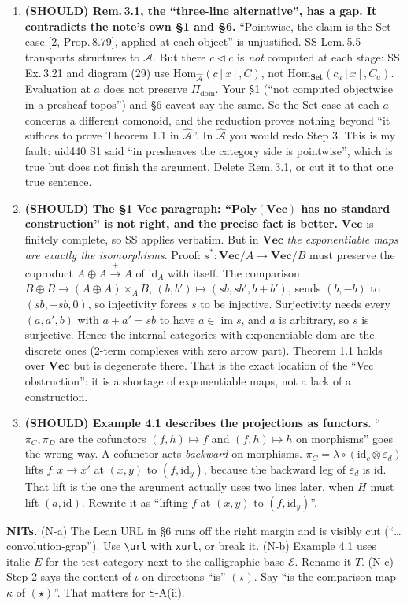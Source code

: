 \documentclass[10pt]{amsart}
\newcommand{\tri}{\mathbin{\triangleleft}}
\newcommand{\Poly}{\mathbf{Poly}}
\newcommand{\Set}{\mathbf{Set}}
\newcommand{\Vect}{\mathbf{Vec}}
\newcommand{\E}{\mathcal{E}}
\begin{document}
\begin{enumerate}[label=\textbf{S-\Alph*.},leftmargin=*,start=2]
\item \textbf{(SHOULD) Rem.\,3.1, the ``three-line alternative'', has a gap. It contradicts the note's own \S1 and
  \S6.} ``Pointwise, the claim is the Set case [2, Prop.\,8.79], applied at each object'' is unjustified. SS
  Lem.\,5.5 transports structures to $\widehat{\mathcal A}$. But there $c\tri c$ is \emph{not} computed at each
  stage: SS Ex.\,3.21 and diagram (29) use $\mathrm{Hom}_{\widehat{\mathcal A}}(c[x],C)$, not
  $\mathrm{Hom}_\Set(c_a[x],C_a)$. Evaluation at $a$ does not preserve $\Pi_{\mathrm{dom}}$. Your \S1 (``not computed
  objectwise in a presheaf topos'') and \S6 caveat say the same. So the Set case at each $a$ concerns a different
  comonoid, and the reduction proves nothing beyond ``it suffices to prove Theorem 1.1 in $\widehat{\mathcal A}$''.
  In $\widehat{\mathcal A}$ you would redo Step 3. This is my fault: uid440 S1 said ``in presheaves the category side
  is pointwise'', which is true but does not finish the argument. Delete Rem.\,3.1, or cut it to that one true
  sentence.
\item \textbf{(SHOULD) The \S1 Vec paragraph: ``$\Poly(\Vect)$ has no standard construction'' is not right, and the
  precise fact is better.} $\Vect$ is finitely complete, so SS applies verbatim. But in $\Vect$ \emph{the
  exponentiable maps are exactly the isomorphisms}. Proof: $s^*\colon\Vect/A\to\Vect/B$ must preserve the coproduct
  $A\oplus A\xrightarrow{+}A$ of $\mathrm{id}_A$ with itself. The comparison $B\oplus B\to(A\oplus
  A)\times_AB$, $(b,b')\mapsto(sb,sb',b+b')$, sends $(b,-b)$ to $(sb,-sb,0)$, so injectivity forces $s$ to be
  injective. Surjectivity needs every $(a,a',b)$ with $a+a'=sb$ to have $a\in\operatorname{im}s$, and $a$ is
  arbitrary, so $s$ is surjective. Hence the internal categories with exponentiable $\mathrm{dom}$ are the discrete
  ones (2-term complexes with zero arrow part). Theorem 1.1 holds over $\Vect$ but is degenerate there. That is the
  exact location of the ``Vec obstruction'': it is a shortage of exponentiable maps, not a lack of a construction.
\item \textbf{(SHOULD) Example 4.1 describes the projections as functors.} ``$\pi_C,\pi_D$ are the cofunctors
  $(f,h)\mapsto f$ and $(f,h)\mapsto h$ on morphisms'' goes the wrong way. A cofunctor acts \emph{backward} on
  morphisms. $\pi_C=\lambda\circ(\mathrm{id}_c\otimes\varepsilon_d)$ lifts $f\colon x\to x'$ at $(x,y)$ to
  $(f,\mathrm{id}_y)$, because the backward leg of $\varepsilon_d$ is $\mathrm{id}$. That lift is the one the
  argument actually uses two lines later, when $H$ must lift $(a,\mathrm{id})$. Rewrite it as ``lifting $f$ at
  $(x,y)$ to $(f,\mathrm{id}_y)$''.
\end{enumerate}
\textbf{NITs.} (N-a) The Lean URL in \S6 runs off the right margin and is visibly cut (``\dots
convolution-grap''). Use \verb|\url| with \texttt{xurl}, or break it. (N-b) Example 4.1 uses italic $E$ for the test
category next to the calligraphic base $\E$. Rename it $T$. (N-c) Step 2 says the content of $\iota$ on directions
``is'' $(\star)$. Say ``is the comparison map $\kappa$ of $(\star)$''. That matters for S-A(ii).
\end{document}
